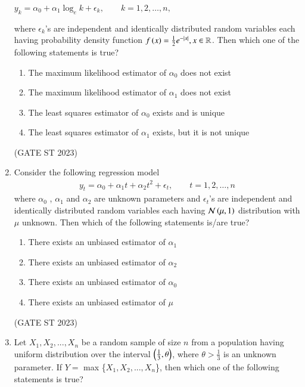 \begin{enumerate}[label=\thechapter.\arabic*,ref=\thechapter.\theenumi]
\begin{center}
	$y_{k} = \alpha_{0} + \alpha_{1} \log_{e}k + \epsilon_{k}, \qquad k = 1,2,…,n,$\\
\end{center}
where $\epsilon_{k}$'s are independent and identically distributed random variables each
having probability density function $ f\left(x\right) = \frac{1}{2} e^{-|x|}, x \in \mathbb{R}$. Then which one of
the following statements is true? 
\begin{enumerate}[label=(\Alph*)]
	\item The maximum likelihood estimator of $\alpha_{0}$ does not exist
	\item The maximum likelihood estimator of $\alpha_{1}$ does not exist
	\item The least squares estimator of $\alpha_{0}$ exists and is unique
	\item The least squares estimator of $\alpha_{1}$ exists, but it is not unique
\end{enumerate}
\hfill(GATE ST 2023)\\

\item Consider the following regression model
\begin{align}
y_t={\alpha}_0+{\alpha}_1t+{\alpha}_2t^2+\epsilon_{t}, \qquad t = 1,2,…,n
\end{align}
where ${\alpha}_0$ , ${\alpha}_1$ and ${\alpha}_2$ are unknown parameters and $\epsilon_{t}$’s are independent and identically distributed random variables each having $\mathcal{N}\left(\mu,1\right)$ distribution with $\mu$ unknown. Then which of the following statements is/are true?
\begin{enumerate}
\item{There exists an unbiased estimator of ${\alpha}_1$}
\item{There exists an unbiased estimator of ${\alpha}_2$}
\item{There exists an unbiased estimator of ${\alpha}_0$}
\item{There exists an unbiased estimator of ${\mu}$}
\end{enumerate}
\hfill(GATE ST 2023)\\

\item Let $X_1, X_2,...,X_n$ be a random sample of size $n$ from a population having uniform distribution over the interval $\left(\frac{1}{3},\theta\right)$, where $\theta>\frac{1}{3}$ is an unknown parameter. If $Y = $ max \{$X_1, X_2,...,X_n$\}, then which one of the following statements is true?

\end{enumerate}
